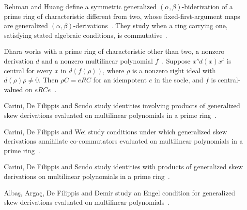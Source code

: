 Rehman and Huang define a symmetric generalized $(\alpha,\beta)$-biderivation
of a prime ring of characteristic different from two, whose
fixed-first-argument maps are generalized $(\alpha,\beta)$-derivations~\cite{WlOnLieIdealsAndSymmetricGeneral2019}. They
study when a ring carrying one, satisfying stated algebraic conditions, is
commutative~\cite{WlOnLieIdealsAndSymmetricGeneral2019}.

Dhara works with a prime ring of characteristic other than two, a nonzero
derivation $d$ and a nonzero multilinear polynomial $f$~\cite{WlDerivationsWithPowerCentralVal2008}. Suppose $x^sd(x)x^t$
is central for every $x$ in $d(f(\rho))$, where $\rho$ is a nonzero right
ideal with
$d(\rho)\rho\neq 0$. Then $\rho C=eRC$ for an idempotent $e$ in the socle, and
$f$ is central-valued on $eRCe$~\cite{WlDerivationsWithPowerCentralVal2008}.

Carini, De Filippis and Scudo study identities involving products of
generalized skew derivations evaluated on multilinear polynomials in a prime
ring~\cite{WlIdentitiesWithProductOfGeneral2016}.

Carini, De Filippis and Wei study conditions under which generalized skew
derivations annihilate co-commutators evaluated on multilinear polynomials in
a prime ring~\cite{WlAnnihilatingCoCommutatorsWithG2017}.

Carini, De Filippis and Scudo study identities with products of generalized
skew derivations on multilinear polynomials in a prime
ring~\cite{WlIdentitiesWithProductOfGeneral2020}.

Alba\c{s}, Arga\c{c}, De Filippis and Demir study an Engel condition for
generalized skew derivations evaluated on multilinear
polynomials~\cite{WlAnEngelConditionWithGeneralize2020}.
